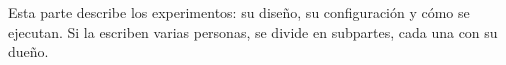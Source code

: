 
Esta parte describe los experimentos: su diseño, su configuración y cómo se ejecutan.
Si la escriben varias personas, se divide en subpartes, cada una con su dueño.
